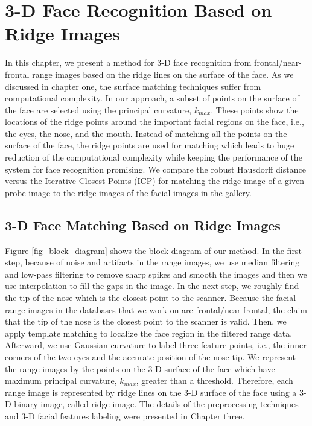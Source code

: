 \chapter{3-D Face Recognition Based on Ridge Images} In this
chapter, we present a method for 3-D face recognition from
frontal/near-frontal range images based on the ridge lines on the
surface of the face. As we discussed in chapter one, the surface
matching techniques suffer from computational complexity. In our
approach, a subset of points on the surface of the face are selected
using the principal curvature, $k_{max}$. These points show the
locations of the ridge points around the important facial regions on
the face, i.e., the eyes, the nose, and the mouth. Instead of
matching all the points on the surface of the face, the ridge points
are used for matching which leads to huge reduction of the
computational complexity while keeping the performance of the system
for face recognition promising. We compare the robust Hausdorff
distance versus the Iterative Closest Points (ICP) for matching the
ridge image of a given probe image to the ridge images of the facial
images in the gallery.

\section{3-D Face Matching Based on Ridge Images}
Figure \ref{fig_block_diagram} shows the block diagram of our
method. In the first step, because of noise and artifacts in the
range images, we use median filtering and low-pass filtering to
remove sharp spikes and smooth the images and then we use
interpolation to fill the gaps in the image. In the next step, we
roughly find the tip of the nose which is the closest point to the
scanner. Because the facial range images in the databases that we
work on are frontal/near-frontal, the claim that the tip of the nose
is the closest point to the scanner is valid. Then, we apply
template matching to localize the face region in the filtered range
data. Afterward, we use Gaussian curvature to label three feature
points, i.e., the inner corners of the two eyes and the accurate
position of the nose tip. We represent the range images by the
points on the 3-D surface of the face which have maximum principal
curvature, $k_{max}$, greater than a threshold. Therefore, each
range image is represented by ridge lines on the 3-D surface of the
face using a 3-D binary image, called ridge image. The details of
the preprocessing techniques and 3-D facial features labeling were
presented in Chapter three.

